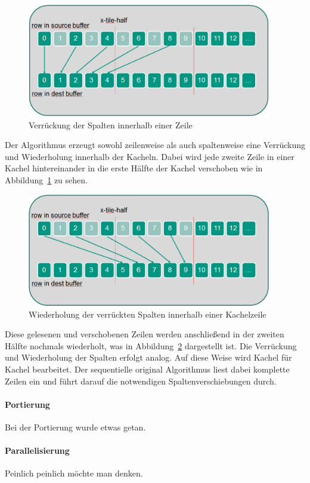 \begin{figure}[h]
\begin{center}
\includegraphics[width=0.95\textwidth]{gtile1.png}
\end{center}
\caption{Verrückung der Spalten innerhalb einer Zeile}\label{fig:gtile1}
\end{figure}
Der Algorithmus erzeugt sowohl zeilenweise als auch spaltenweise eine Verrückung und Wiederholung innerhalb der Kacheln. Dabei wird jede zweite Zeile in einer Kachel hintereinander in die erste Hälfte der Kachel verschoben wie in Abbildung~\ref{fig:gtile1} zu sehen.\newline
\begin{figure}[h]
\begin{center}
\includegraphics[width=0.95\textwidth]{gtile2.png}
\end{center}
\caption{Wiederholung der verrückten Spalten innerhalb einer Kachelzeile}\label{fig:gtile2}
\end{figure}
Diese gelesenen und verschobenen Zeilen werden anschließend in der zweiten Hälfte nochmals wiederholt, was in Abbildung~\ref{fig:gtile2} dargestellt ist.\newline
Die Verrückung und Wiederholung der Spalten erfolgt analog. Auf diese Weise wird Kachel für Kachel bearbeitet. Der sequentielle original Algorithmus liest dabei komplette Zeilen ein und führt darauf die notwendigen Spaltenverschiebungen durch.

\paragraph{Portierung}
Bei der Portierung wurde etwas getan.

\paragraph{Parallelisierung}
Peinlich peinlich möchte man denken.